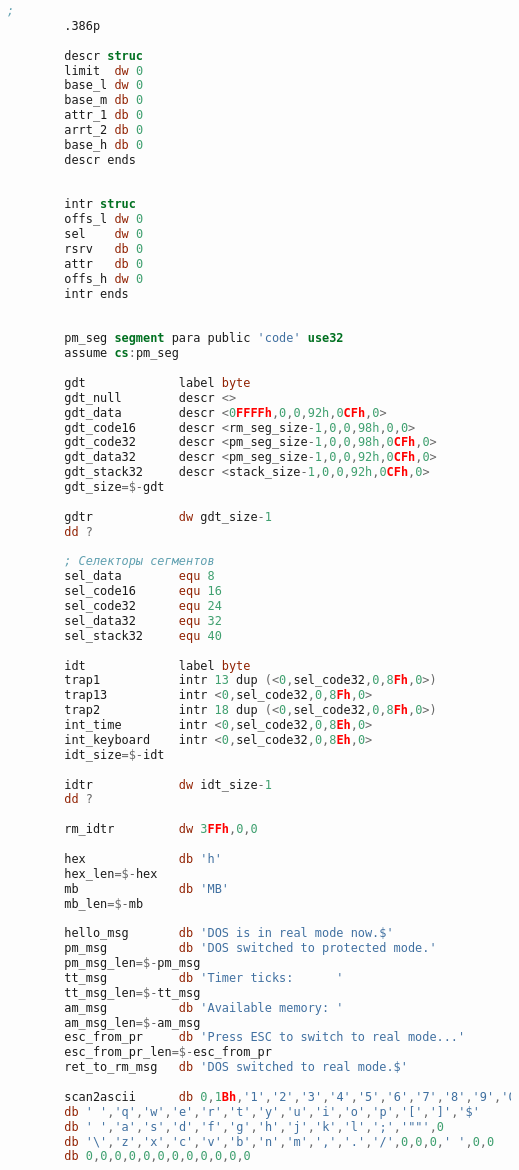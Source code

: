 \documentclass[12pt]{report}
\begin{document}
	\begin{lstlisting}[label=one,caption = Процессы-сироты, language=nasm, style= nasm]
		;
		.386p
		
		descr struc
		limit  dw 0
		base_l dw 0
		base_m db 0
		attr_1 db 0
		arrt_2 db 0
		base_h db 0
		descr ends
		
		
		intr struc
		offs_l dw 0
		sel    dw 0
		rsrv   db 0
		attr   db 0
		offs_h dw 0
		intr ends
		
		
		pm_seg segment para public 'code' use32
		assume cs:pm_seg
		
		gdt             label byte
		gdt_null        descr <>
		gdt_data        descr <0FFFFh,0,0,92h,0CFh,0>
		gdt_code16      descr <rm_seg_size-1,0,0,98h,0,0>
		gdt_code32      descr <pm_seg_size-1,0,0,98h,0CFh,0>
		gdt_data32      descr <pm_seg_size-1,0,0,92h,0CFh,0>
		gdt_stack32     descr <stack_size-1,0,0,92h,0CFh,0>
		gdt_size=$-gdt
		
		gdtr            dw gdt_size-1
		dd ?
		
		; Селекторы сегментов
		sel_data        equ 8
		sel_code16      equ 16
		sel_code32      equ 24
		sel_data32      equ 32
		sel_stack32     equ 40
		
		idt             label byte
		trap1           intr 13 dup (<0,sel_code32,0,8Fh,0>)
		trap13          intr <0,sel_code32,0,8Fh,0>
		trap2           intr 18 dup (<0,sel_code32,0,8Fh,0>)
		int_time        intr <0,sel_code32,0,8Eh,0>
		int_keyboard    intr <0,sel_code32,0,8Eh,0>
		idt_size=$-idt
		
		idtr            dw idt_size-1
		dd ?
		
		rm_idtr         dw 3FFh,0,0
		
		hex             db 'h'
		hex_len=$-hex
		mb              db 'MB'
		mb_len=$-mb
		
		hello_msg       db 'DOS is in real mode now.$'
		pm_msg          db 'DOS switched to protected mode.'
		pm_msg_len=$-pm_msg
		tt_msg          db 'Timer ticks:      '
		tt_msg_len=$-tt_msg
		am_msg          db 'Available memory: '
		am_msg_len=$-am_msg
		esc_from_pr     db 'Press ESC to switch to real mode...'
		esc_from_pr_len=$-esc_from_pr
		ret_to_rm_msg   db 'DOS switched to real mode.$'
		
		scan2ascii      db 0,1Bh,'1','2','3','4','5','6','7','8','9','0','-','=',8
		db ' ','q','w','e','r','t','y','u','i','o','p','[',']','$'
		db ' ','a','s','d','f','g','h','j','k','l',';','""',0
		db '\','z','x','c','v','b','n','m',',','.','/',0,0,0,' ',0,0
		db 0,0,0,0,0,0,0,0,0,0,0,0
		

\end{lstlisting}
\end{document}
